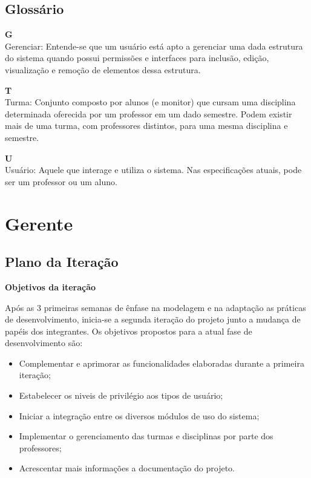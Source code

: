 \documentclass[12pt,letterpaper]{article}
\begin{document}
\pagebreak
\subsection{Glossário}

  {\bf G}\\
    Gerenciar: Entende-se que um usuário está apto a gerenciar uma dada
  estrutura do sistema quando possui permissões e interfaces para inclusão,
  edição, visualização e remoção de elementos dessa estrutura. 
    
  {\bf T}\\
    Turma: Conjunto composto por alunos (e monitor) que cursam uma disciplina 
    determinada oferecida por um professor em um dado semestre. Podem
    existir mais de uma turma, com professores distintos, para uma mesma 
    disciplina e semestre.  
    
  {\bf U}\\
    Usuário: Aquele que interage e utiliza o sistema. Nas especificações
    atuais, pode ser um professor ou um aluno.


\pagebreak
\section{Gerente}

\subsection{Plano da Iteração}

\vspace{1cm}
{\large {\bf Objetivos da iteração}}
\vspace{0.5cm}

Após as 3 primeiras semanas de ênfase na modelagem e na adaptação as práticas 
de desenvolvimento, inicia-se a segunda iteração do projeto junto a mudança de 
papéis dos integrantes.
Os objetivos propostos para a atual fase de desenvolvimento são:

\begin{itemize}
\item{} Complementar e aprimorar as funcionalidades elaboradas durante a primeira iteração;
\item{} Estabelecer os niveis de privilégio aos tipos de usuário;
\item{} Iniciar a integração entre os diversos módulos de uso do sistema;
\item{} Implementar o gerenciamento das turmas e disciplinas por parte dos professores;
\item{} Acrescentar mais informações a documentação do projeto.
\end{itemize}
\end{document}

